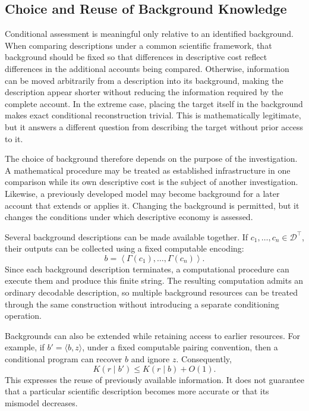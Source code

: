
\subsection*{Choice and Reuse of Background Knowledge}

Conditional assessment is meaningful only relative to an identified background. When comparing descriptions under a common scientific framework, that background should be fixed so that differences in descriptive cost reflect differences in the additional accounts being compared. Otherwise, information can be moved arbitrarily from a description into its background, making the description appear shorter without reducing the information required by the complete account. In the extreme case, placing the target itself in the background makes exact conditional reconstruction trivial. This is mathematically legitimate, but it answers a different question from describing the target without prior access to it.

The choice of background therefore depends on the purpose of the investigation. A mathematical procedure may be treated as established infrastructure in one comparison while its own descriptive cost is the subject of another investigation. Likewise, a previously developed model may become background for a later account that extends or applies it. Changing the background is permitted, but it changes the conditions under which descriptive economy is assessed.

Several background descriptions can be made available together. If $c_1,\ldots,c_n\in\mathcal{D}^\top$, their outputs can be collected using a fixed computable encoding:
\[
b = \left\langle\Gamma(c_1),\ldots,\Gamma(c_n)\right\rangle.
\]
Since each background description terminates, a computational procedure can execute them and produce this finite string. The resulting computation admits an ordinary decodable description, so multiple background resources can be treated through the same construction without introducing a separate conditioning operation.

Backgrounds can also be extended while retaining access to earlier resources. For example, if $b'=\langle b,z\rangle$, under a fixed computable pairing convention, then a conditional program can recover $b$ and ignore $z$. Consequently,
\[
K(r\mid b')\leq K(r\mid b)+O(1).
\]
This expresses the reuse of previously available information. It does not guarantee that a particular scientific description becomes more accurate or that its mismodel decreases.

